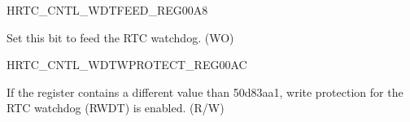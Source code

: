 \begin{register}{H}{RTC\_CNTL\_WDTFEED\_REG}{\hexprefix{}00A8}\label{regdesc:RTCCNTLWDTFEEDREG}
%
%
\regnewline%
\begin{regdesc}\begin{reglist}
\label{fielddesc:RTCCNTLRTCWDTFEED}\item [RTC\_CNTL\_RTC\_WDT\_FEED] Set this bit to feed the RTC watchdog. (WO)
\end{reglist}\end{regdesc}
\end{register}


\begin{register}{H}{RTC\_CNTL\_WDTWPROTECT\_REG}{\hexprefix{}00AC}\label{regdesc:RTCCNTLWDTWPROTECTREG}
%
\regnewline%
\begin{regdesc}\begin{reglist}
\label{fielddesc:RTCCNTLWDTWKEY}\item [RTC\_CNTL\_WDT\_WKEY] If the register contains a different value than \hexprefix{}50d83aa1, write protection for the RTC watchdog (RWDT) is enabled. (R/W)
\end{reglist}\end{regdesc}
\end{register}


